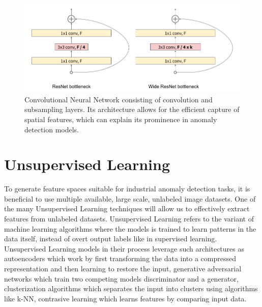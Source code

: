 \begin{figure}[h]
	\begin{center}
		\includegraphics[width=1.0\linewidth]{Chapter_2/wide_resnet.png}
	\end{center}
	\caption{Convolutional Neural Network consisting of convolution and subsampling layers. Its architecture allows for the efficient capture of spatial features, which can explain its prominence in anomaly detection models.}
	\label{fig:cnn}
\end{figure}

\section{Unsupervised Learning}
\label{usupervised learning}
To generate feature spaces suitable for industrial anomaly detection tasks, it is beneficial to use multiple available, large scale, unlabeled image datasets. One of the many Unsupervised Learning techniques will allow us to effectively extract features from unlabeled datasets. Unsupervised Learning refers to the variant of machine learning algorithms where the models is trained to learn patterns in the data itself, instead of overt output labels like in supervised learning. Unsupervised Learning models in their process leverage such architectures as autoencoders which work by first transforming the data into a compressed representation and then learning to restore the input, generative adversarial networks which train two competing models discriminator and a generator, clusterization algorithms which separates the input into clusters using algorithms like k-NN, contrasive learning which learns features by comparing input data. 

